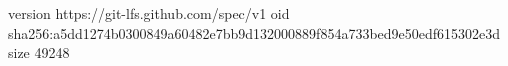 version https://git-lfs.github.com/spec/v1
oid sha256:a5dd1274b0300849a60482e7bb9d132000889f854a733bed9e50edf615302e3d
size 49248
